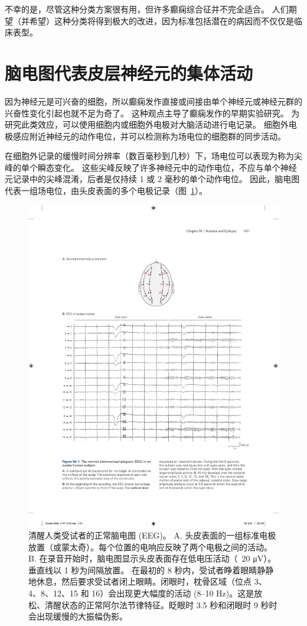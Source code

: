 不幸的是，尽管这种分类方案很有用，但许多癫痫综合征并不完全适合。
人们期望（并希望）这种分类将得到极大的改进，因为标准包括潜在的病因而不仅仅是临床表型。



\section{脑电图代表皮层神经元的集体活动}

因为神经元是可兴奋的细胞，所以癫痫发作直接或间接由单个神经元或神经元群的兴奋性变化引起也就不足为奇了。
这种观点主导了癫痫发作的早期实验研究。
为研究此类效应，可以使用细胞内或细胞外电极对大脑活动进行电记录。
细胞外电极感应附近神经元的动作电位，并可以检测称为场电位的细胞群的同步活动。


在细胞外记录的缓慢时间分辨率（数百毫秒到几秒）下，场电位可以表现为称为尖峰的单个瞬态变化。
这些尖峰反映了许多神经元中的动作电位，不应与单个神经元记录中的尖峰混淆，后者是仅持续 1 或 2 毫秒的单个动作电位。
因此，脑电图代表一组场电位，由头皮表面的多个电极记录（图~\ref{fig:58_1}）。


\begin{figure}[htbp]
	\centering
	\includegraphics[width=0.95\linewidth]{chap58/fig_58_1}
	\caption{清醒人类受试者的正常脑电图 (EEG)。 A. 头皮表面的一组标准电极放置（或蒙太奇）。每个位置的电响应反映了两个电极之间的活动。B. 在录音开始时，脑电图显示头皮表面存在低电压活动（~20 μV）。 垂直线以 1 秒为间隔放置。 在最初的 8 秒内，受试者睁着眼睛静静地休息，然后要求受试者闭上眼睛。闭眼时，枕骨区域（位点 3、4、8、12、15 和 16）会出现更大幅度的活动 (8–10 Hz)。这是放松、清醒状态的正常阿尔法节律特征。眨眼时 3.5 秒和闭眼时 9 秒时会出现缓慢的大振幅伪影。}
	\label{fig:58_1}
\end{figure}


